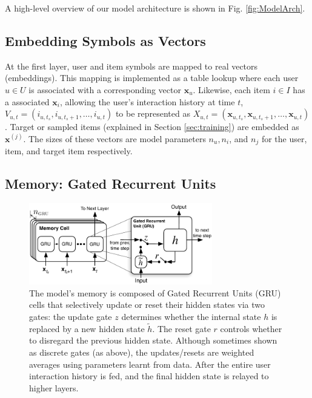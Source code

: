 \documentclass{sig-alternate-05-2015}
\newcommand{\mat}[1]{\mathbf{#1}}
\begin{document}
A high-level overview of our model architecture is shown in Fig. \ref{fig:ModelArch}. 

\subsection{Embedding Symbols as Vectors}
At the first layer, user and item symbols are mapped to real  vectors (embeddings). This mapping is implemented as a table lookup where each user $u \in U$ is associated with a corresponding vector $\mat{x}_u$. Likewise, each item $i \in I$ has a associated $\mat{x}_i$, allowing the user's interaction history at time $t$, $V_{u,t} = (i_{u,t_s}, i_{u,t_s + 1}, \dots, i_{u,t})$ to be represented as $X_{u,t} = (\mat{x}_{u,t_s}, \mat{x}_{u,t_s + 1}, \dots, \mat{x}_{u,t})$. Target or sampled items (explained in Section \ref{sec:training}) are embedded as $\mat{x}^{(j)}$. The sizes of these vectors are model parameters $n_{u}, n_i$, and $n_j$ for the user, item, and target item respectively. 

\subsection{Memory: Gated Recurrent Units}
\begin{figure}
\centering
	\includegraphics[width=8cm]{images/GRU}
	\caption{The model's memory is composed of Gated Recurrent Units (GRU) cells that selectively update or reset their hidden states via two gates: the update gate $z$ determines whether the internal state $h$ is replaced by a new hidden state $\tilde{h}$. The reset gate $r$ controls whether to disregard the previous hidden state. Although sometimes shown as discrete gates (as above), the updates/resets are weighted averages using parameters learnt from data. After the entire user interaction history is fed, and the final hidden state is relayed to higher layers.}
	\label{fig:GRU}
\end{figure}
\end{document}
